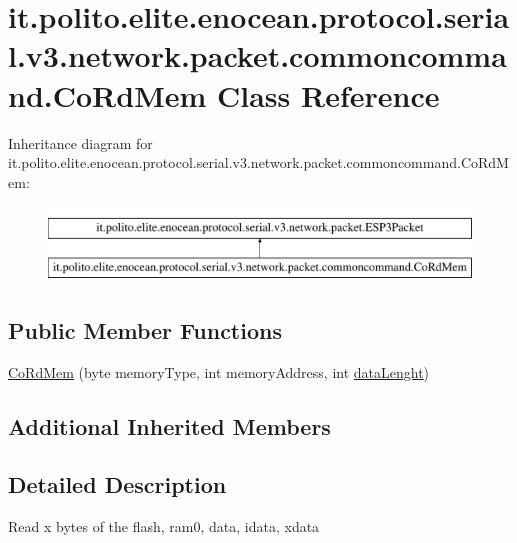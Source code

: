 \hypertarget{classit_1_1polito_1_1elite_1_1enocean_1_1protocol_1_1serial_1_1v3_1_1network_1_1packet_1_1commoncommand_1_1_co_rd_mem}{}\section{it.\+polito.\+elite.\+enocean.\+protocol.\+serial.\+v3.\+network.\+packet.\+commoncommand.\+Co\+Rd\+Mem Class Reference}
\label{classit_1_1polito_1_1elite_1_1enocean_1_1protocol_1_1serial_1_1v3_1_1network_1_1packet_1_1commoncommand_1_1_co_rd_mem}
Inheritance diagram for it.\+polito.\+elite.\+enocean.\+protocol.\+serial.\+v3.\+network.\+packet.\+commoncommand.\+Co\+Rd\+Mem\+:\begin{figure}[H]
\begin{center}
\leavevmode
\includegraphics[height=2.000000cm]{classit_1_1polito_1_1elite_1_1enocean_1_1protocol_1_1serial_1_1v3_1_1network_1_1packet_1_1commoncommand_1_1_co_rd_mem}
\end{center}
\end{figure}
\subsection*{Public Member Functions}
\begin{DoxyCompactItemize}
\item 
\hyperlink{classit_1_1polito_1_1elite_1_1enocean_1_1protocol_1_1serial_1_1v3_1_1network_1_1packet_1_1commoncommand_1_1_co_rd_mem_a0c56dcd4c49b88e8d55dd1b51708758e}{Co\+Rd\+Mem} (byte memory\+Type, int memory\+Address, int \hyperlink{classit_1_1polito_1_1elite_1_1enocean_1_1protocol_1_1serial_1_1v3_1_1network_1_1packet_1_1_e_s_p3_packet_a2e253ec9078e2ae469d50d6887c396e0}{data\+Lenght})
\end{DoxyCompactItemize}
\subsection*{Additional Inherited Members}


\subsection{Detailed Description}
Read x bytes of the flash, ram0, data, idata, xdata


